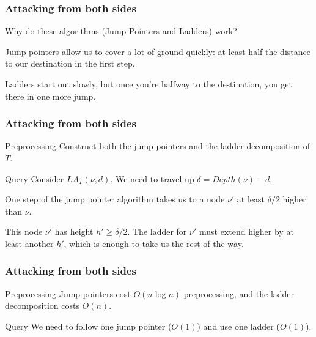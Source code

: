 \documentclass[aspectratio=169]{beamer}
\begin{document}
\begin{frame}
\frametitle{Attacking from both sides}

Why do these algorithms (Jump Pointers and Ladders) work?

\pause\vspace{1em}
Jump pointers allow us to cover a lot of ground quickly: at least half the
distance to our destination in the first step.

\pause\vspace{1em}
Ladders start out slowly, but once you're halfway to the destination, you
get there in one more jump.

\end{frame}

\begin{frame}
\frametitle{Attacking from both sides}

\begin{block}{Preprocessing}
  Construct both the jump pointers and the ladder decomposition of $T$.
\end{block}

\pause

\begin{block}{Query}
  Consider $LA_T(\nu, d)$.  We need to travel up
  $\delta = Depth(\nu) - d$.

  \pause\vspace{1em} One step of the jump pointer algorithm takes us to a
  node $\nu'$ at least $\delta/2$ higher than $\nu$.

  \pause\vspace{1em} This node $\nu'$ has height $h' \ge \delta/2$.  The
  ladder for $\nu'$ must extend higher by at least another $h'$, which is
  enough to take us the rest of the way.
\end{block}

\end{frame}

\begin{frame}
\frametitle{Attacking from both sides }

\begin{block}{Preprocessing}
  Jump pointers cost $O(n\log n)$ preprocessing, and the ladder
  decomposition costs $O(n)$.
\end{block}

\pause

\begin{block}{Query}
  We need to follow one jump pointer ($O(1)$) and use one ladder ($O(1)$).
\end{block}

\end{frame}
\end{document}
